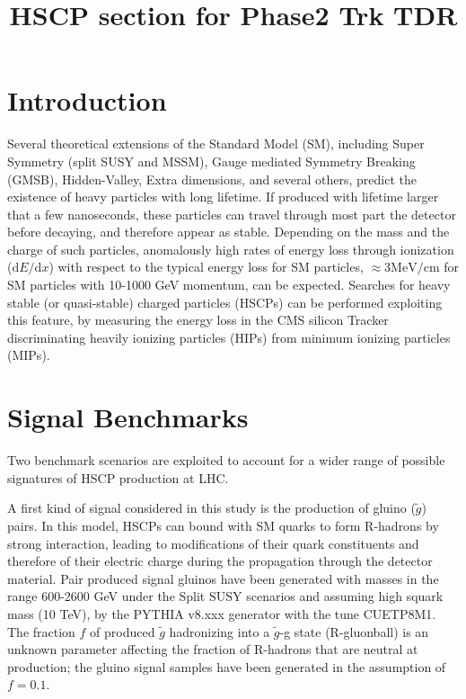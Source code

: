 \documentclass[11pt,oneside,a4paper]{article}
\title{HSCP section for Phase2 Trk TDR}
\date{}
\begin{document}
\maketitle

\section{Introduction}

Several theoretical extensions of the Standard Model (SM), including Super Symmetry (split SUSY and MSSM), Gauge mediated Symmetry Breaking (GMSB), Hidden-Valley, Extra dimensions, and several others, predict the existence of heavy particles with long lifetime.
If produced with lifetime larger that a few nanoseconds, these particles can travel through most part the detector before decaying, and therefore appear as stable.
Depending on the mass and the charge of such particles, anomalously high rates of energy loss through ionization ($\mathrm{d}E/\mathrm{d}x$) with respect to the typical energy loss for SM particles, $\approx 3 \mathrm{MeV}/\mathrm{cm}$ for SM particles with 10-1000 GeV momentum, can be expected. 
Searches for heavy stable (or quasi-stable) charged particles (HSCPs) can be performed exploiting this feature, by measuring the energy loss in the CMS silicon Tracker discriminating heavily ionizing particles (HIPs) from minimum ionizing particles (MIPs).

\section{Signal Benchmarks}

Two benchmark scenarios are exploited to account for a wider range of possible signatures of HSCP production at LHC.

A first kind of signal considered in this study is the production of gluino ($\tilde{g}$) pairs. 
In this model, HSCPs can bound with SM quarks to form R-hadrons by strong interaction, leading to modifications of their quark constituents and therefore of their electric charge during the propagation through the detector material.
Pair produced signal gluinos have been generated with masses in the range 600-2600 GeV under the Split SUSY scenarios and assuming high squark mass (10 TeV), by the PYTHIA v8.xxx generator with the tune CUETP8M1.
The fraction $f$ of produced $\tilde{g}$ hadronizing into a $\tilde{g}$-g state (R-gluonball) is an unknown parameter affecting the fraction of R-hadrons that are neutral at production; the gluino signal samples have been generated in the assumption of $f = 0.1$.
\end{document}
